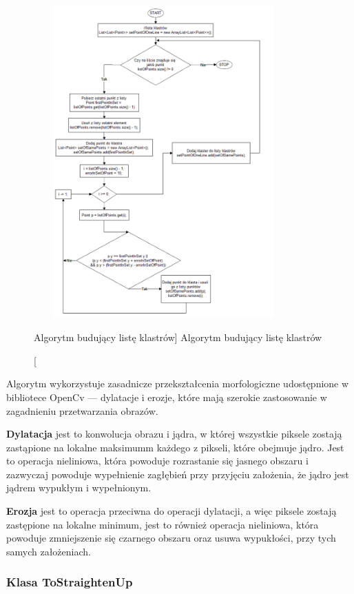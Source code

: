 \documentclass[a4paper,12pt]{article}
\begin{document}
    			\begin{figure}[!ht]  
    		        \begin{center}
    		    	    \includegraphics[height=12cm, width=10cm]{image//algorithm//prepareImgToAnalizePred.png} 
    			    \end{center}
        			\caption
        			    [Algorytm budujący listę klastrów]  
            			{Algorytm budujący listę klastrów}  
    		    \end{figure}
		        \newpage
		        Algorytm wykorzystuje zasadnicze przekształcenia morfologiczne udostępnione w bibliotece OpenCv --- dylatacje i erozje, które mają szerokie zastosowanie w zagadnieniu przetwarzania obrazów. \par
		        \textbf{Dylatacja} jest to konwolucja obrazu i jądra, w której wszystkie piksele zostają zastąpione na lokalne maksimumm każdego z pikseli, które obejmuje jądro. Jest to operacja nieliniowa, która powoduje rozrastanie się jasnego obszaru i zazwyczaj powoduje wypełnienie zagłębień przy przyjęciu założenia, że jądro jest jądrem wypukłym i wypełnionym. \par
    		    \textbf{Erozja} jest to operacja przeciwna do operacji dylatacji, a więc piksele zostają zastępione na lokalne minimum, jest to również operacja nieliniowa, która powoduje zmniejszenie się czarnego obszaru oraz usuwa wypukłości, przy tych samych założeniach.
		    
		\subsubsection{Klasa ToStraightenUp}		
\end{document}
